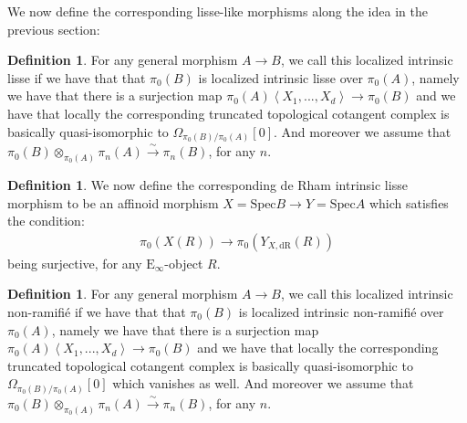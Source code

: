 \documentclass[12pt]{amsart}
\theoremstyle{definition}
\newtheorem{definition}[theorem]{Definition}
\numberwithin{equation}{section}
\begin{document}
\indent We now define the corresponding lisse-like morphisms along the idea in the previous section:


\begin{definition}
For any general morphism $A\rightarrow B$, we call this localized intrinsic lisse if we have that that $\pi_0(B)$ is localized intrinsic lisse over $\pi_0(A)$, namely we have that there is a surjection map $\pi_0(A)\left<X_1,...,X_d\right>\rightarrow \pi_0(B)$ and we have that locally the corresponding truncated topological cotangent complex is basically quasi-isomorphic to $\Omega_{\pi_0(B)/\pi_0(A)}[0]$. And moreover we assume that $\pi_0(B)\otimes_{\pi_0(A)}\pi_n(A)\overset{\sim}{\rightarrow}\pi_n(B)$, for any $n$.	
\end{definition}






\begin{definition}
We now define the corresponding de Rham intrinsic lisse morphism to be an affinoid morphism $X=\mathrm{Spec}B\rightarrow Y=\mathrm{Spec}A$ which satisfies the condition:
\begin{align}
\pi_0(X(R))\overset{}{\rightarrow}	\pi_0(Y_{X,\mathrm{dR}}(R))
\end{align}
being surjective, for any $\mathrm{E}_\infty$-object $R$.		
\end{definition}


\begin{definition}
For any general morphism $A\rightarrow B$, we call this localized intrinsic non-ramifi\'e if we have that that $\pi_0(B)$ is localized intrinsic non-ramifi\'e over $\pi_0(A)$, namely we have that there is a surjection map $\pi_0(A)\left<X_1,...,X_d\right>\rightarrow \pi_0(B)$ and we have that locally the corresponding truncated topological cotangent complex is basically quasi-isomorphic to $\Omega_{\pi_0(B)/\pi_0(A)}[0]$ which vanishes as well. And moreover we assume that $\pi_0(B)\otimes_{\pi_0(A)}\pi_n(A)\overset{\sim}{\rightarrow}\pi_n(B)$, for any $n$.	
\end{definition}






\end{document}
